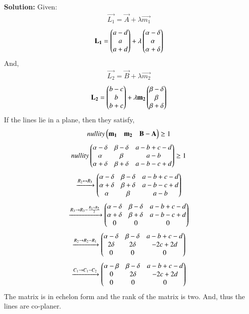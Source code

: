 \documentclass[journal,12pt,onecolumn]{IEEEtran}
\begin{document}
	\textbf{Solution:}
		Given:
		\begin{align}
				\vec{L_1} = \vec{A} + \lambda\vec{m_1}
		\end{align}
		\begin{align}
				\mathbf{L_1} = \begin{pmatrix}a-d \\a\\a+d\end{pmatrix} + \lambda
				\begin{pmatrix}\alpha - \delta\\\alpha\\\alpha + \delta \end{pmatrix}
		\end{align}And,
		\begin{align}
				\vec{L_2} = \vec{B} + \lambda\vec{m_2}
		\end{align}
		\begin{align}
				\mathbf{L_2} = \begin{pmatrix}b-c\\b\\b+c\end{pmatrix} + \lambda\mathbf{m_2}
				\begin{pmatrix}\beta - \delta\\\beta\\\beta + \delta \end{pmatrix}
		\end{align}
		If the lines lie in a plane, then they satisfy,
		\begin{align}
				nullity\begin{pmatrix}\mathbf{m_1}&\mathbf{m_2}&\mathbf{B-A}\end{pmatrix}\geq 1
		\end{align}
		\begin{align}
				nullity\begin{pmatrix}
						\alpha - \delta & \beta -\delta & a-b+c-d \\
						\alpha & \beta & a-b \\
						\alpha + \delta & \beta +\delta & a-b-c+d
				\end{pmatrix}\geq 1
		\end{align}
		\begin{align}
				\xrightarrow[]{R_2\leftrightarrow R_3}\begin{pmatrix}
						\alpha - \delta & \beta -\delta & a-b+c-d \\
						\alpha + \delta & \beta +\delta & a-b-c+d\\
						\alpha & \beta & a-b 
				\end{pmatrix}
		\end{align}
		\begin{align}
				\xrightarrow[]{R_3\rightarrow R_3-\frac{R_1+R_2}{2}}\begin{pmatrix}
						\alpha - \delta & \beta -\delta & a-b+c-d \\
						\alpha + \delta & \beta +\delta & a-b-c+d\\
						0 & 0 & 0 
				\end{pmatrix}
		\end{align}
		\begin{align}
				\xrightarrow[]{R_2\rightarrow R_2-R_1}\begin{pmatrix}
						\alpha - \delta & \beta -\delta & a-b+c-d \\
						2\delta & 2\delta & -2c+2d\\
						0 & 0 & 0 
				\end{pmatrix}
		\end{align}
		\begin{align}
				\xrightarrow[]{C_1\rightarrow C_1-C_2}\begin{pmatrix}
						\alpha - \beta & \beta -\delta & a-b+c-d \\
						0 & 2\delta & -2c+2d\\
						0 & 0 & 0 
				\end{pmatrix}
		\end{align}
		The matrix is in echelon form and the rank of the matrix is two. And, thus the lines are co-planer.
		
\end{document}
